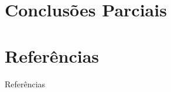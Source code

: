 \documentclass[xcolor=table]{beamer}
\begin{document}
    \section[]{Conclusões Parciais}
    
    
    

    \section[]{Referências}
    \begin{frame}[allowframebreaks]{Referências}
        
    \end{frame}
\end{document}

